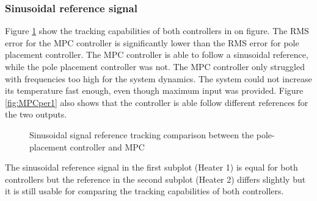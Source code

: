 \subsubsection{Sinusoidal reference signal}
Figure \ref{fig:compSinC} show the tracking capabilities of both controllers in on figure. The RMS error for the MPC controller is significantly lower than the RMS error for pole placement controller. The MPC controller is able to follow a sinusoidal reference, while the pole placement controller was not. The MPC controller only struggled with frequencies too high for the system dynamics. The system could not increase its temperature fast enough, even though maximum input was provided. Figure \ref{fig:MPCper1} also shows that the controller is able follow different references for the two outputs.

\begin{figure}
    \centering
    
    \caption{Sinusoidal signal reference tracking comparison between the pole-placement controller and MPC}
    \label{fig:compSinC}
\end{figure}

The sinusoidal reference signal in the first subplot (Heater 1) is equal for both controllers but the reference in the second subplot (Heater 2) differs slightly but it is still usable for comparing the tracking capabilities of both controllers.  

